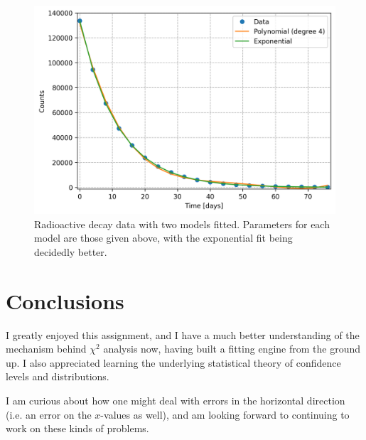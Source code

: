 \documentclass{article}
\begin{document}
\begin{figure}[H]
    \centering
    \includegraphics[width=6in]{homework6/decay.png}
    \caption{Radioactive decay data with two models fitted. Parameters for each model are those given above, with the exponential fit being decidedly better.}
    \label{fig:decay}
\end{figure}

\section{Conclusions}

I greatly enjoyed this assignment, and I have a much better understanding of the mechanism behind $\chi^2$ analysis now, having built a fitting engine from the ground up. I also appreciated learning the underlying statistical theory of confidence levels and distributions.

I am curious about how one might deal with errors in the horizontal direction (i.e. an error on the $x$-values as well), and am looking forward to continuing to work on these kinds of problems.
\end{document}
